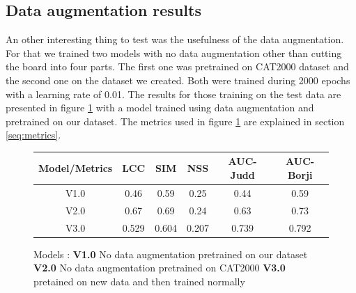\subsection{Data augmentation results}\label{section:augmentation}
An other interesting thing to test was the usefulness of the data augmentation. For that we trained two models with no data augmentation other than cutting the board into four parts. The first one was pretrained on CAT2000 dataset\cite{DBLP:journals/corr/BorjiI15} and the second one on the dataset we created. Both were trained during 2000 epochs with a learning rate of 0.01. The results for those training on the test data are presented in figure \ref{fig:augment} with a model trained using data augmentation and pretrained on our dataset. The metrics used in figure \ref{fig:augment} are explained in section \ref{seq:metrics}.
\begin{figure}[ht!]
    \centering
\begin{tabular}{|c|c|c|c|c|c|}
  \hline
  Model/Metrics & LCC & SIM & NSS & AUC-Judd & AUC-Borji \\
  \hline
  V1.0 & 0.46 & 0.59 & 0.25 & 0.44 & 0.59 \\
  V2.0 & 0.67 & 0.69 & 0.24 & 0.63 & 0.73 \\
  V3.0 & 0.529 & 0.604 & 0.207 & 0.739 & 0.792\\
  \hline
\end{tabular}
 \caption{Models : \textbf{V1.0} No data augmentation pretrained on our dataset  \textbf{V2.0}
 No data augmentation pretrained on CAT2000 \textbf{V3.0} pretained on new data and then trained normally}
 \label{fig:augment}
\end{figure}

